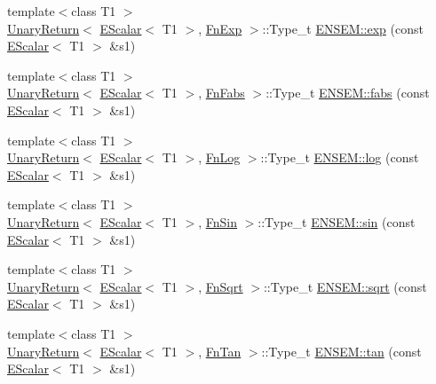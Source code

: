 \begin{DoxyCompactItemize}
\item 
{\footnotesize template$<$class T1 $>$ }\\\mbox{\hyperlink{structENSEM_1_1UnaryReturn}{Unary\+Return}}$<$ \mbox{\hyperlink{classENSEM_1_1EScalar}{E\+Scalar}}$<$ T1 $>$, \mbox{\hyperlink{structENSEM_1_1FnExp}{Fn\+Exp}} $>$\+::Type\+\_\+t \mbox{\hyperlink{group__escalar_ga80b6028648c4f7d8f84f04d129bfa976}{E\+N\+S\+E\+M\+::exp}} (const \mbox{\hyperlink{classENSEM_1_1EScalar}{E\+Scalar}}$<$ T1 $>$ \&s1)
\item 
{\footnotesize template$<$class T1 $>$ }\\\mbox{\hyperlink{structENSEM_1_1UnaryReturn}{Unary\+Return}}$<$ \mbox{\hyperlink{classENSEM_1_1EScalar}{E\+Scalar}}$<$ T1 $>$, \mbox{\hyperlink{structENSEM_1_1FnFabs}{Fn\+Fabs}} $>$\+::Type\+\_\+t \mbox{\hyperlink{group__escalar_ga60eef052054b1a7da3e16a844de7d565}{E\+N\+S\+E\+M\+::fabs}} (const \mbox{\hyperlink{classENSEM_1_1EScalar}{E\+Scalar}}$<$ T1 $>$ \&s1)
\item 
{\footnotesize template$<$class T1 $>$ }\\\mbox{\hyperlink{structENSEM_1_1UnaryReturn}{Unary\+Return}}$<$ \mbox{\hyperlink{classENSEM_1_1EScalar}{E\+Scalar}}$<$ T1 $>$, \mbox{\hyperlink{structENSEM_1_1FnLog}{Fn\+Log}} $>$\+::Type\+\_\+t \mbox{\hyperlink{group__escalar_gabe969a92b7a6a506a417bb17fdf68b4c}{E\+N\+S\+E\+M\+::log}} (const \mbox{\hyperlink{classENSEM_1_1EScalar}{E\+Scalar}}$<$ T1 $>$ \&s1)
\item 
{\footnotesize template$<$class T1 $>$ }\\\mbox{\hyperlink{structENSEM_1_1UnaryReturn}{Unary\+Return}}$<$ \mbox{\hyperlink{classENSEM_1_1EScalar}{E\+Scalar}}$<$ T1 $>$, \mbox{\hyperlink{structENSEM_1_1FnSin}{Fn\+Sin}} $>$\+::Type\+\_\+t \mbox{\hyperlink{group__escalar_ga373122acba11edfbe0eff82093788afe}{E\+N\+S\+E\+M\+::sin}} (const \mbox{\hyperlink{classENSEM_1_1EScalar}{E\+Scalar}}$<$ T1 $>$ \&s1)
\item 
{\footnotesize template$<$class T1 $>$ }\\\mbox{\hyperlink{structENSEM_1_1UnaryReturn}{Unary\+Return}}$<$ \mbox{\hyperlink{classENSEM_1_1EScalar}{E\+Scalar}}$<$ T1 $>$, \mbox{\hyperlink{structENSEM_1_1FnSqrt}{Fn\+Sqrt}} $>$\+::Type\+\_\+t \mbox{\hyperlink{group__escalar_ga4e0889a609d84d3ddac113e68bfccfa4}{E\+N\+S\+E\+M\+::sqrt}} (const \mbox{\hyperlink{classENSEM_1_1EScalar}{E\+Scalar}}$<$ T1 $>$ \&s1)
\item 
{\footnotesize template$<$class T1 $>$ }\\\mbox{\hyperlink{structENSEM_1_1UnaryReturn}{Unary\+Return}}$<$ \mbox{\hyperlink{classENSEM_1_1EScalar}{E\+Scalar}}$<$ T1 $>$, \mbox{\hyperlink{structENSEM_1_1FnTan}{Fn\+Tan}} $>$\+::Type\+\_\+t \mbox{\hyperlink{group__escalar_ga560632c018611046a7009dc56681b77d}{E\+N\+S\+E\+M\+::tan}} (const \mbox{\hyperlink{classENSEM_1_1EScalar}{E\+Scalar}}$<$ T1 $>$ \&s1)

\end{DoxyCompactItemize}
